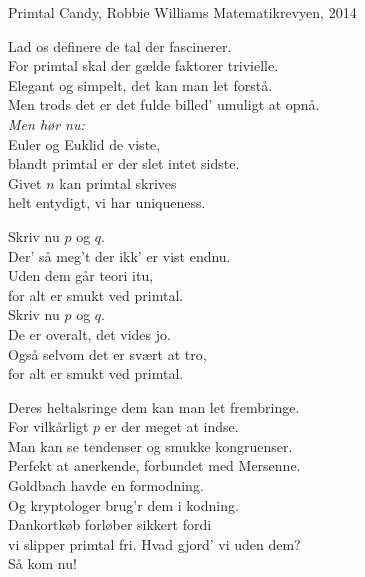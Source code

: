 \begin{song}{Primtal}
  {} %
  {Candy, Robbie Williams} %
  {} %
  {Matematikrevyen, 2014} %
  {\NotCCLIed} %

  \begin{SBVerse}
    Lad os definere de tal der fascinerer.\\
    For primtal skal der gælde faktorer trivielle.\\
    Elegant og simpelt, det kan man let forstå.\\
    Men trods det er det fulde billed’ umuligt at opnå.\\\medskip
    \emph{Men hør nu:}\\
    Euler og Euklid de viste,\\
    blandt primtal er der slet intet sidste.\\
    Givet $n$ kan primtal skrives\\
    helt entydigt, vi har uniqueness.
  \end{SBVerse}

  \begin{SBChorus}
    Skriv nu $p$ og $q$.\\
    Der’ så meg’t der ikk’ er vist endnu.\\
    Uden dem går teori itu,\\
    for alt er smukt ved primtal.\\
    Skriv nu $p$ og $q$.\\
    De er overalt, det vides jo.\\
    Også selvom det er svært at tro,\\
    for alt er smukt ved primtal.
  \end{SBChorus}

  \begin{SBVerse}
    Deres heltalsringe dem kan man let frembringe.\\
    For vilkårligt $p$ er der meget at indse.\\
    Man kan se tendenser og smukke kongruenser.\\
    Perfekt at anerkende, forbundet med Mersenne.\\\medskip
    Goldbach havde en formodning.\\
    Og kryptologer brug’r dem i kodning.\\
    Dankortkøb forløber sikkert fordi\\
    vi slipper primtal fri. Hvad gjord’ vi uden dem?\\
    Så kom nu!
  \end{SBVerse}


\end{song}

